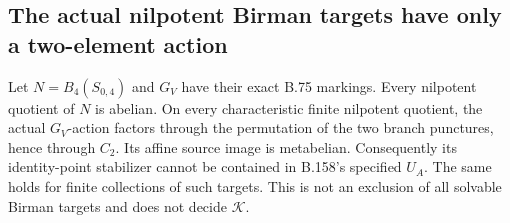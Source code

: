 \subsection*{The actual nilpotent Birman targets have only a two-element action}
\label{stmt:B160}
Let \(N=B_4(S_{0,4})\) and \(G_V\) have their exact B.75
markings. Every nilpotent quotient of \(N\) is abelian.
On every characteristic finite nilpotent quotient, the actual
\(G_V\)-action factors through the permutation of the two branch
punctures, hence through \(C_2\). Its affine source image is
metabelian. Consequently its identity-point stabilizer cannot
be contained in B.158's specified \(U_A\). The same holds for
finite collections of such targets. This is not an exclusion
of all solvable Birman targets and does not decide \(\mathcal K\).

